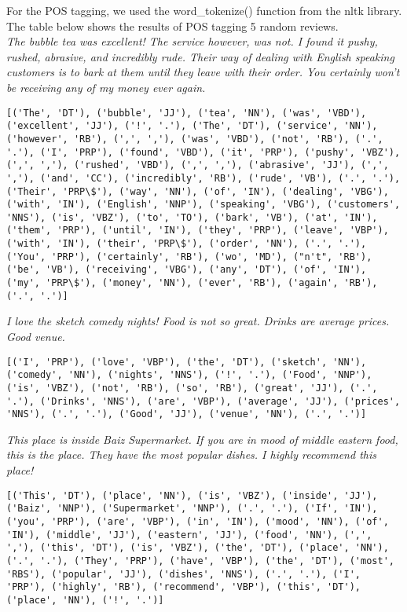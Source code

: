 For the POS tagging, we used the word\_tokenize() function from the nltk library. The table below shows the results of POS tagging 5 random reviews.\\

\textit{The bubble tea was excellent! The service however, was not. I found it pushy, rushed, abrasive, and incredibly rude. Their way of dealing with English speaking customers is to bark at them until they leave with their order. You certainly won't be receiving any of my money ever again.}\\
\begin{Verbatim}[breaklines=true, breakanywhere=true]
[('The', 'DT'), ('bubble', 'JJ'), ('tea', 'NN'), ('was', 'VBD'), ('excellent', 'JJ'), ('!', '.'), ('The', 'DT'), ('service', 'NN'), ('however', 'RB'), (',', ','), ('was', 'VBD'), ('not', 'RB'), ('.', '.'), ('I', 'PRP'), ('found', 'VBD'), ('it', 'PRP'), ('pushy', 'VBZ'), (',', ','), ('rushed', 'VBD'), (',', ','), ('abrasive', 'JJ'), (',', ','), ('and', 'CC'), ('incredibly', 'RB'), ('rude', 'VB'), ('.', '.'), ('Their', 'PRP\$'), ('way', 'NN'), ('of', 'IN'), ('dealing', 'VBG'), ('with', 'IN'), ('English', 'NNP'), ('speaking', 'VBG'), ('customers', 'NNS'), ('is', 'VBZ'), ('to', 'TO'), ('bark', 'VB'), ('at', 'IN'), ('them', 'PRP'), ('until', 'IN'), ('they', 'PRP'), ('leave', 'VBP'), ('with', 'IN'), ('their', 'PRP\$'), ('order', 'NN'), ('.', '.'), ('You', 'PRP'), ('certainly', 'RB'), ('wo', 'MD'), ("n't", 'RB'), ('be', 'VB'), ('receiving', 'VBG'), ('any', 'DT'), ('of', 'IN'), ('my', 'PRP\$'), ('money', 'NN'), ('ever', 'RB'), ('again', 'RB'), ('.', '.')]
\end{Verbatim}

\textit{I love the sketch comedy nights! Food is not so great. Drinks are average prices. Good venue.}\\
\begin{Verbatim}[breaklines=true, breakanywhere=true] 
[('I', 'PRP'), ('love', 'VBP'), ('the', 'DT'), ('sketch', 'NN'), ('comedy', 'NN'), ('nights', 'NNS'), ('!', '.'), ('Food', 'NNP'), ('is', 'VBZ'), ('not', 'RB'), ('so', 'RB'), ('great', 'JJ'), ('.', '.'), ('Drinks', 'NNS'), ('are', 'VBP'), ('average', 'JJ'), ('prices', 'NNS'), ('.', '.'), ('Good', 'JJ'), ('venue', 'NN'), ('.', '.')]
\end{Verbatim}

\textit{This place is inside Baiz Supermarket. If you are in mood of middle eastern food, this is the place. They have the most popular dishes. I highly recommend this place!}\\
\begin{Verbatim}[breaklines=true, breakanywhere=true] 
[('This', 'DT'), ('place', 'NN'), ('is', 'VBZ'), ('inside', 'JJ'), ('Baiz', 'NNP'), ('Supermarket', 'NNP'), ('.', '.'), ('If', 'IN'), ('you', 'PRP'), ('are', 'VBP'), ('in', 'IN'), ('mood', 'NN'), ('of', 'IN'), ('middle', 'JJ'), ('eastern', 'JJ'), ('food', 'NN'), (',', ','), ('this', 'DT'), ('is', 'VBZ'), ('the', 'DT'), ('place', 'NN'), ('.', '.'), ('They', 'PRP'), ('have', 'VBP'), ('the', 'DT'), ('most', 'RBS'), ('popular', 'JJ'), ('dishes', 'NNS'), ('.', '.'), ('I', 'PRP'), ('highly', 'RB'), ('recommend', 'VBP'), ('this', 'DT'), ('place', 'NN'), ('!', '.')]
\end{Verbatim}

